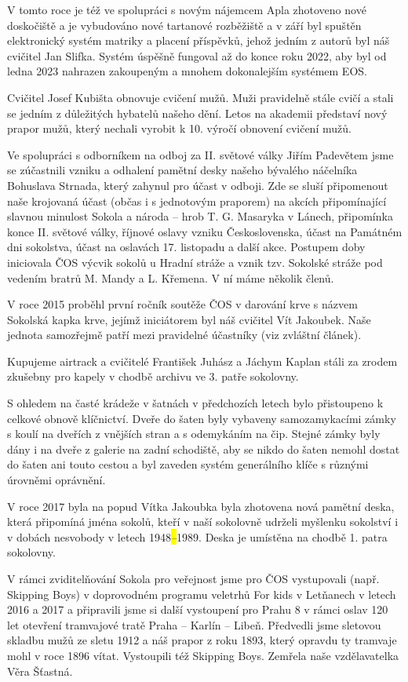 V tomto roce je též ve spolupráci s novým nájemcem Apla zhotoveno nové
doskočiště a je vybudováno nové tartanové rozběžiště a v září byl
spuštěn elektronický systém matriky a placení příspěvků, jehož jedním z
autorů byl náš cvičitel Jan Slifka. Systém úspěšně fungoval až do konce
roku 2022, aby byl od ledna 2023 nahrazen zakoupeným a mnohem
dokonalejším systémem EOS.

Cvičitel Josef Kubišta obnovuje cvičení mužů. Muži pravidelně stále
cvičí a stali se jedním z důležitých hybatelů našeho dění. Letos na
akademii představí nový prapor mužů, který nechali vyrobit k 10. výročí
obnovení cvičení mužů.

Ve spolupráci s odborníkem na odboj za II. světové války Jiřím Padevětem
jsme se zúčastnili vzniku a odhalení pamětní desky našeho bývalého
náčelníka Bohuslava Strnada, který zahynul pro účast v odboji. Zde se
sluší připomenout naše krojovaná účast (občas i s jednotovým praporem)
na akcích připomínající slavnou minulost Sokola a národa -- hrob T. G.
Masaryka v Lánech, připomínka konce II. světové války, říjnové oslavy
vzniku Československa, účast na Památném dni sokolstva, účast na
oslavách 17. listopadu a další akce. Postupem doby iniciovala ČOS výcvik
sokolů u Hradní stráže a vznik tzv. Sokolské stráže pod vedením bratrů
M. Mandy a L. Křemena. V ní máme několik členů.

V roce 2015 proběhl první ročník soutěže ČOS v darování krve s názvem
Sokolská kapka krve, jejímž iniciátorem byl náš cvičitel Vít Jakoubek.
Naše jednota samozřejmě patří mezi pravidelné účastníky (viz zvláštní
článek).

Kupujeme airtrack a cvičitelé František Juhász a Jáchym Kaplan stáli za
zrodem zkušebny pro kapely v chodbě archivu ve 3. patře sokolovny.

S ohledem na časté krádeže v šatnách v předchozích letech bylo
přistoupeno k celkové obnově klíčnictví. Dveře do šaten byly vybaveny
samozamykacími zámky s koulí na dveřích z vnějších stran a s odemykáním
na čip. Stejné zámky byly dány i na dveře z galerie na zadní schodiště,
aby se nikdo do šaten nemohl dostat do šaten ani touto cestou a byl
zaveden systém generálního klíče s různými úrovněmi oprávnění.

V roce 2017 byla na popud Vítka Jakoubka byla zhotovena nová pamětní
deska, která připomíná jména sokolů, kteří v naší sokolovně udrželi
myšlenku sokolství i v dobách nesvobody v letech 1948\emph{\hl{--}}1989.
Deska je umístěna na chodbě 1. patra sokolovny.

V rámci zviditelňování Sokola pro veřejnost jsme pro ČOS vystupovali
(např. Skipping Boys) v doprovodném programu veletrhů For kids v
Letňanech v letech 2016 a 2017 a připravili jsme si další vystoupení pro
Prahu 8 v rámci oslav 120 let otevření tramvajové tratě Praha -- Karlín
-- Libeň. Předvedli jsme sletovou skladbu mužů ze sletu 1912 a náš
prapor z roku 1893, který opravdu ty tramvaje mohl v roce 1896 vítat.
Vystoupili též Skipping Boys. Zemřela naše vzdělavatelka Věra Šťastná.

